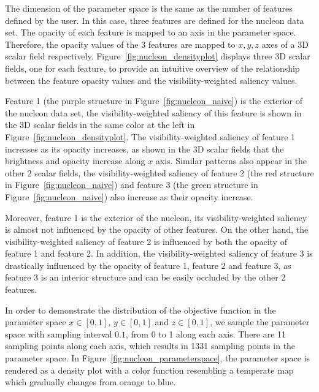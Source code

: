 The dimension of the parameter space is the same as the number of features defined by the user. In this case, three features are defined for the nucleon data set. The opacity of each feature is mapped to an axis in the parameter space. Therefore, the opacity values of the 3 features are mapped to $ x, y, z $ axes of a 3D scalar field respectively. Figure~\ref{fig:nucleon_densityplot} displays three 3D scalar fields, one for each feature, to provide an intuitive overview of the relationship between the feature opacity values and the visibility-weighted saliency values.

Feature 1 (the purple structure in Figure~\ref{fig:nucleon_naive}) is the exterior of the nucleon data set, the visibility-weighted saliency of this feature is shown in the 3D scalar fields in the same color at the left in Figure~\ref{fig:nucleon_densityplot}.
The visibility-weighted saliency of feature 1 increases as its opacity increases, as shown in the 3D scalar fields that the brightness and opacity increase along $ x $ axis. Similar patterns also appear in the other 2 scalar fields, the visibility-weighted saliency of feature 2 (the red structure in Figure~\ref{fig:nucleon_naive}) and feature 3 (the green structure in Figure~\ref{fig:nucleon_naive}) also increase as their opacity increase.

Moreover, feature 1 is the exterior of the nucleon, its visibility-weighted saliency is almost not influenced by the opacity of other features. On the other hand, the visibility-weighted saliency of feature 2 is influenced by both the opacity of feature 1 and feature 2. In addition, the visibility-weighted saliency of feature 3 is drastically influenced by the opacity of feature 1, feature 2 and feature 3, as feature 3 is an interior structure and can be easily occluded by the other 2 features.

In order to demonstrate the distribution of the objective function in the parameter space $ x \in [0,1] $, $ y \in [0,1] $ and $ z \in [0,1] $, we sample the parameter space with sampling interval $ 0.1 $, from 0 to 1 along each axis. There are 11 sampling points along each axis, which results in 1331 sampling points in the parameter space. In Figure~\ref{fig:nucleon_parameterspace}, the parameter space is rendered as a density plot with a color function resembling a temperate map which gradually changes from orange to blue.

